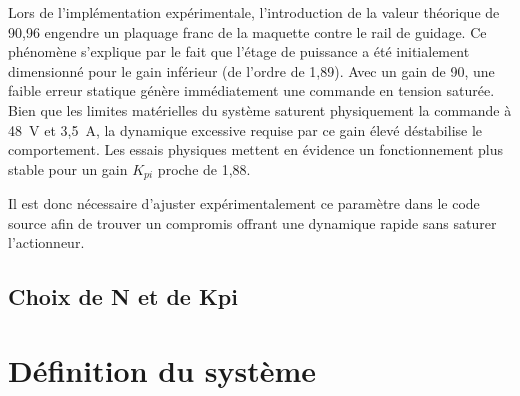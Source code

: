 Lors de l'implémentation expérimentale, l'introduction de la valeur théorique de 90,96 engendre un plaquage franc de la maquette contre le rail de guidage. Ce phénomène s'explique par le fait que l'étage de puissance a été initialement dimensionné pour le gain inférieur (de l'ordre de 1,89). Avec un gain de 90, une faible erreur statique génère immédiatement une commande en tension saturée. Bien que les limites matérielles du système saturent physiquement la commande à 48~V et 3,5~A, la dynamique excessive requise par ce gain élevé déstabilise le comportement. Les essais physiques mettent en évidence un fonctionnement plus stable pour un gain $K_{pi}$ proche de 1,88.

Il est donc nécessaire d'ajuster expérimentalement ce paramètre dans le code source afin de trouver un compromis offrant une dynamique rapide sans saturer l'actionneur.


\subsection{Choix de N et de Kpi}

\section{Définition du système}


